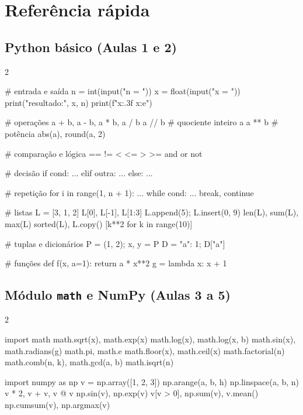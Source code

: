 \chapter{Referência rápida}
\label{ap:referencia}

\section*{Python básico (Aulas 1 e 2)}

\begin{multicols}{2}
\begin{codigo}
# entrada e saída
n = int(input("n = "))
x = float(input("x = "))
print("resultado:", x, n)
print(f"{x:.3f}  {x:e}")

# operações
a + b, a - b, a * b, a / b
a // b      # quociente inteiro
a %
a ** b      # potência
abs(a), round(a, 2)

# comparação e lógica
==  !=  <  <=  >  >=
and   or   not

# decisão
if cond:
    ...
elif outra:
    ...
else:
    ...
\end{codigo}

\columnbreak

\begin{codigo}
# repetição
for i in range(1, n + 1):
    ...
while cond:
    ...
break, continue

# listas
L = [3, 1, 2]
L[0], L[-1], L[1:3]
L.append(5); L.insert(0, 9)
len(L), sum(L), max(L)
sorted(L), L.copy()
[k**2 for k in range(10)]

# tuplas e dicionários
P = (1, 2);  x, y = P
D = {"a": 1};  D["a"]

# funções
def f(x, a=1):
    return a * x**2
g = lambda x: x + 1
\end{codigo}
\end{multicols}

\section*{Módulo \texttt{math} e NumPy (Aulas 3 a 5)}

\begin{multicols}{2}
\begin{codigo}
import math
math.sqrt(x), math.exp(x)
math.log(x), math.log(x, b)
math.sin(x), math.radians(g)
math.pi, math.e
math.floor(x), math.ceil(x)
math.factorial(n)
math.comb(n, k), math.gcd(a, b)
math.isqrt(n)
\end{codigo}

\columnbreak

\begin{codigo}
import numpy as np
v = np.array([1, 2, 3])
np.arange(a, b, h)
np.linspace(a, b, n)
v * 2, v + v, v @ v
np.sin(v), np.exp(v)
v[v > 0], np.sum(v), v.mean()
np.cumsum(v), np.argmax(v)
\end{codigo}
\end{multicols}

